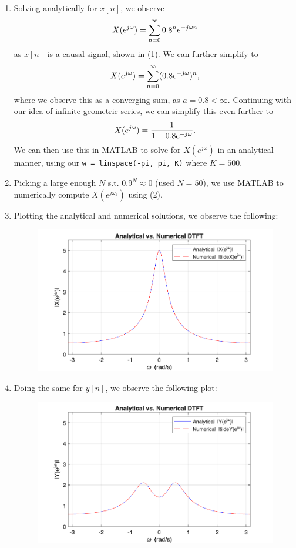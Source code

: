 \documentclass[11pt]{article}
\begin{document}
\begin{enumerate}[label=\textbf{\alph*)}, leftmargin=2.6em]
    \item Solving analytically for $x[n]$, we observe
    \begin{equation} \notag
        X(e^{j\omega}) = \sum_{n=0}^{\infty}0.8^n e^{-j\omega n}
    \end{equation}
    as $x[n]$ is a causal signal, shown in (1). We can further simplify to 
    \begin{equation} \notag
        X(e^{j\omega}) = \sum_{n=0}^{\infty}(0.8e^{-j\omega})^n,
    \end{equation}
    where we observe this as a converging sum, as $a=0.8<\infty$.
    Continuing with our idea of infinite geometric series, we can simplify this even further to
    \begin{equation} \notag
        X(e^{j\omega}) = \frac{1}{1-0.8e^{-j\omega}}.
    \end{equation}
    We can then use this in MATLAB to solve for $X(e^{j\omega})$ in an analytical manner, using our
    \texttt{w = linspace(-pi, pi, K)} where $K = 500$.

    \item Picking a large enough $N$ s.t. $0.9^N\approx 0$ (used $N=50$), we use MATLAB to numerically compute 
    $X(e^{j\omega_k})$ using (2).

    \item Plotting the analytical and numerical solutions, we observe the following:
    \begin{figure} [H]
        \centering
        \includegraphics[width=0.6\linewidth]{partc.png}
    \end{figure}

    \item Doing the same for $y[n]$, we observe the following plot:
    \begin{figure} [H]
        \centering
        \includegraphics[width=0.6\linewidth]{partd.png}
    \end{figure}


\end{enumerate}
\end{document}

